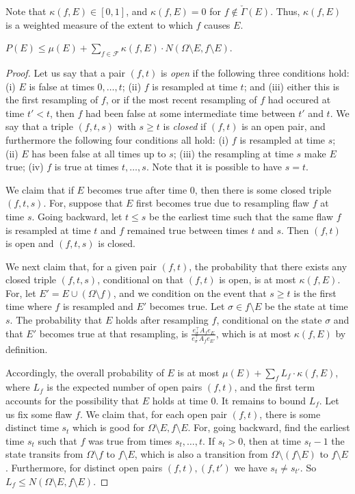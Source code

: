 \documentclass{toc}
\begin{document}
Note that $\kappa(f, E) \in [0,1]$, and $\kappa(f,E) = 0$ for $f \notin \check \Gamma(E)$. Thus, $\kappa(f, E)$ is a weighted measure of the extent to which $f$ causes $E$.  


\begin{theorem}
\label{distthm1e} 
$P(E) \leq \mu(E) +  \sum_{f \in \mathcal F}  \kappa(f, E) \cdot N (\Omega \setminus E, f \setminus E)$.
\end{theorem}
\begin{proof}
Let us say that a pair $(f,t)$ is \emph{open} if the following three conditions hold: (i) $E$ is false at times $0, \dots, t$; (ii) $f$ is resampled at time $t$; and (iii) either this is the first resampling of $f$, or if the most recent resampling of $f$ had occured at time $t' < t$, then $f$ had been false at some intermediate time between $t'$ and $t$.  We say that a triple $(f,t,s)$ with $s \geq t$ is \emph{closed} if $(f,t)$ is an open pair, and furthermore the following four conditions  all hold: (i) $f$ is resampled at time $s$; (ii) $E$ has been false at all times up to $s$; (iii) the resampling at time $s$ make $E$ true; (iv) $f$ is true at times $t, \dots, s$. Note that it is possible to have $s = t$.

We claim that if $E$ becomes true after time 0, then there is some closed triple $(f,t,s)$. For, suppose that $E$ first becomes true due to resampling flaw $f$ at time $s$. Going backward, let $t \leq s$ be the earliest time such that the same flaw $f$ is resampled at time $t$ and $f$ remained true between times $t$ and $s$. Then $(f,t)$ is open and $(f,t,s)$ is closed.

We next claim that, for a given pair $(f,t)$, the probability that there exists any closed triple $(f,t,s)$, conditional on that $(f,t)$ is open, is at most $\kappa(f,E)$. For, let $E' = E \cup (\Omega \setminus f)$, and we condition on the event that $s \geq t$ is the first time where  $f$ is resampled and $E'$ becomes true. Let $\sigma \in f \setminus E$ be the state at time $s$. The probability that $E$ holds after resampling $f$, conditional on the state $\sigma$ and that $E'$ becomes true at that resampling,  is $\frac{ e_{\sigma}^{\top} A_f e_{E}  }{e_{\sigma}^{\top} A_f e_{E'}}$, which is at most $\kappa(f,E)$ by definition.

Accordingly, the overall probability of  $E$ is at most $\mu(E) + \sum_f L_f \cdot \kappa(f, E)$, where $L_f$ is the expected number of open pairs $(f,t)$, and the first term accounts for the possibility that $E$ holds at time 0. It remains to bound $L_f$. Let us fix some flaw $f$. We claim that, for each open pair $(f,t)$, there is some distinct time $s_t$ which is good for $\Omega \setminus E,  f \setminus E$. For, going backward, find the earliest time $s_t$ such that $f$ was true from times $s_t, \dots, t$.  If $s_t > 0$, then at time $s_t - 1$ the state transits from $\Omega \setminus f$ to $f \setminus E$, which is also a transition from $\Omega \setminus (f \setminus E)$ to $f \setminus E$. Furthermore, for distinct open pairs $(f,t), (f,t')$ we have $s_t \neq s_{t'}$. So  $L_f \leq N(\Omega \setminus E, f \setminus E)$.
\end{proof}
\end{document}
